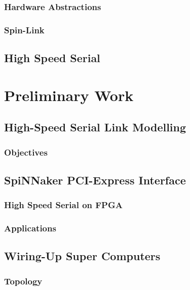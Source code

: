 \documentclass[a4paper,11pt,titlepage]{report}
\begin{document}
			\subsection{Hardware Abstractions}
			
			\subsection{Spin-Link}
		
		
		\section{High Speed Serial}
	
	
	
	\chapter{Preliminary Work}
		
		\section{High-Speed Serial Link Modelling}
			
			\subsection{Objectives}
		
		\section{SpiNNaker PCI-Express Interface}
			
			\subsection{High Speed Serial on FPGA}
			
			\subsection{Applications}
		
		\section{Wiring-Up Super Computers}
			
			\subsection{Topology}
			
\end{document}

